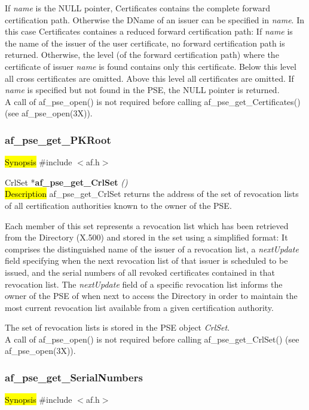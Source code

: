If {\em name} is the NULL pointer, Certificates contains the complete forward certification path. Otherwise
the DName of an issuer can be specified in {\em name}. In this case Certificates containes a reduced forward 
certification path:
\be
\m If {\em name} is the name of the issuer of the user certificate, no forward certification path
   is returned. 
\m Otherwise, the level (of the forward certification path) where the certificate of issuer {\em name} is found
   contains only this certificate.
\m Below this level all cross certificates are omitted.
\m Above this level all certificates are omitted.
\ee
If {\em name} is specified but not found in the PSE, the NULL pointer is returned.
\\ [1em]
A call of af\_pse\_open() is not required before calling af\_pse\_get\_Certificates()
(see af\_pse\_open(3X)).


\subsubsection{af\_pse\_get\_PKRoot}
\label{af_get_CrlSet}
\hl{Synopsis}
\#include $<$af.h$>$

CrlSet *{\bf af\_pse\_get\_CrlSet} {\em ()} \\
\hl{Description}
af\_pse\_get\_CrlSet returns the address of the set of revocation lists of all
certification authorities known to the owner of the PSE.

Each member of this set represents a revocation list which has been retrieved from 
the Directory (X.500) and stored in the set using a simplified format: It comprises the distinguished
name of the issuer of a revocation list, a {\em nextUpdate} field specifying when the next
revocation list of that issuer is scheduled to be issued, and the serial numbers of all revoked
certificates contained in that revocation list. The {\em nextUpdate} field of a specific 
revocation list informs the owner of the PSE of when next to access the 
Directory in order to maintain the most current revocation list available from a given
certification authority. 

The set of revocation lists is stored in the PSE object {\em CrlSet}.
\\ [1em]
A call of af\_pse\_open() is not required before calling af\_pse\_get\_CrlSet()
(see af\_pse\_open(3X)).


\subsubsection{af\_pse\_get\_SerialNumbers}
\label{af_get_FCPath}
\hl{Synopsis}
\#include $<$af.h$>$ 

